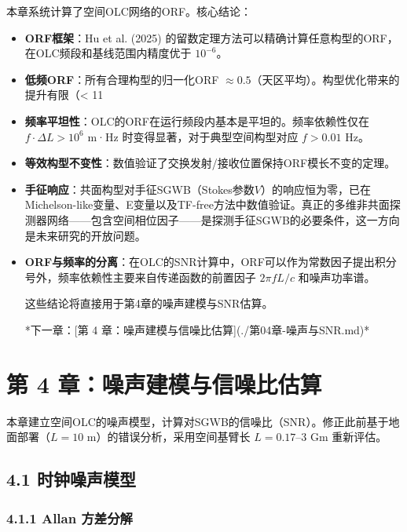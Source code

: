\documentclass[12pt,a4paper]{article}
\begin{document}
本章系统计算了空间OLC网络的ORF。核心结论：

\begin{itemize}
  \item[1] \textbf{ORF框架}：Hu et al. (2025) 的留数定理方法可以精确计算任意构型的ORF，在OLC频段和基线范围内精度优于 $10^{-6}$。

  \item[2] \textbf{低频ORF}：所有合理构型的归一化ORF $\approx 0.5$（天区平均）。构型优化带来的提升有限（< 11%

  \item[3] \textbf{频率平坦性}：OLC的ORF在运行频段内基本是平坦的。频率依赖性仅在 $f \cdot \Delta L > 10^6$ m·Hz 时变得显著，对于典型空间构型对应 $f > 0.01$ Hz。

  \item[4] \textbf{等效构型不变性}：数值验证了交换发射/接收位置保持ORF模长不变的定理。

  \item[5] \textbf{手征响应}：共面构型对手征SGWB（Stokes参数$V$）的响应恒为零，已在Michelson-like变量、E变量以及TF-free方法中数值验证。真正的多维非共面探测器网络——包含空间相位因子——是探测手征SGWB的必要条件，这一方向是未来研究的开放问题。

  \item[6] \textbf{ORF与频率的分离}：在OLC的SNR计算中，ORF可以作为常数因子提出积分号外，频率依赖性主要来自传递函数的前置因子 $2\pi f L/c$ 和噪声功率谱。

这些结论将直接用于第4章的噪声建模与SNR估算。


*下一章：[第 4 章：噪声建模与信噪比估算](./第04章-噪声与SNR.md)*

\end{itemize}
\section{第 4 章：噪声建模与信噪比估算}


本章建立空间OLC的噪声模型，计算对SGWB的信噪比（SNR）。修正此前基于地面部署（$L = 10$ m）的错误分析，采用空间基臂长 $L = 0.17$–3 Gm 重新评估。

\subsection{4.1 时钟噪声模型}


\subsubsection{4.1.1 Allan 方差分解}
\end{document}

